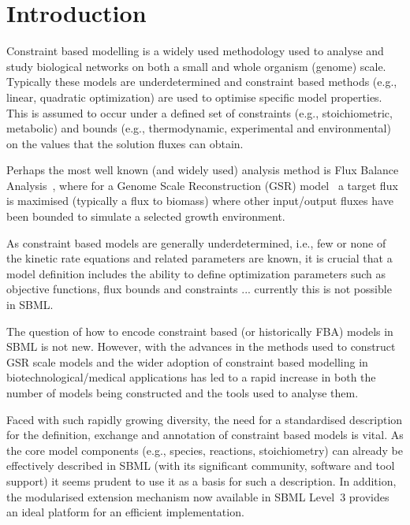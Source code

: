 
\section{Introduction}
\label{intro}

Constraint based modelling is a widely used methodology used to analyse and
study biological networks on both a small and whole organism (genome)
scale. Typically these models are underdetermined and constraint based
methods (e.g., linear, quadratic optimization) are used to optimise
specific model properties. This is assumed to occur under a defined set of
constraints (e.g., stoichiometric, metabolic) and bounds (e.g.,
thermodynamic, experimental and environmental) on the values that the
solution fluxes can obtain.

Perhaps the most well known (and widely used) analysis method is Flux
Balance Analysis~\citep[FBA; ][]{orth_2010}, where for a Genome Scale
Reconstruction (GSR) model~\citep{oberhardt_2009} a target flux is
maximised (typically a flux to biomass) where other input/output fluxes
have been bounded to simulate a selected growth environment.

As constraint based models are generally underdetermined, i.e., few or none
of the kinetic rate equations and related parameters are known, it is
crucial that a model definition includes the ability to define optimization
parameters such as objective functions, flux bounds and constraints
... currently this is not possible in SBML.

The question of how to encode constraint based (or historically FBA) models
in SBML is not new. However, with the advances in the methods used to
construct GSR scale models and the wider adoption of constraint based
modelling in biotechnological/medical applications has led to a rapid
increase in both the number of models being constructed and the tools used
to analyse them.

Faced with such rapidly growing diversity, the need for a standardised
description for the definition, exchange and annotation of constraint
based models is vital. As the core model components (e.g., species,
reactions, stoichiometry) can already be effectively described in SBML
(with its significant community, software and tool support) it seems
prudent to use it as a basis for such a description. In addition, the
modularised extension mechanism now available in SBML Level~3 provides
an ideal platform for an efficient implementation.
